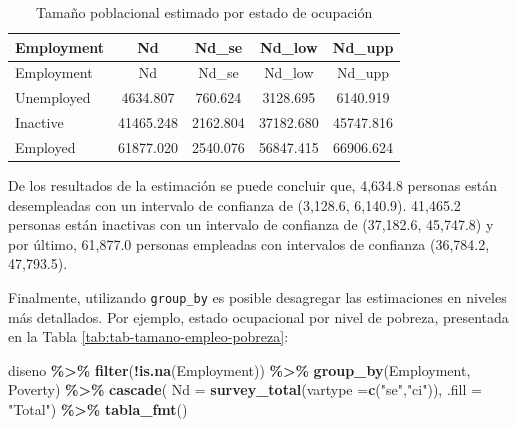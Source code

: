 \documentclass[
  spanish,
  12pt,
]{book}
\newenvironment{Shaded}{\begin{snugshade}}{\end{snugshade}}
\newcommand{\AttributeTok}[1]{\textcolor[rgb]{0.13,0.29,0.53}{#1}}
\newcommand{\FunctionTok}[1]{\textcolor[rgb]{0.13,0.29,0.53}{\textbf{#1}}}
\newcommand{\NormalTok}[1]{#1}
\newcommand{\SpecialCharTok}[1]{\textcolor[rgb]{0.81,0.36,0.00}{\textbf{#1}}}
\newcommand{\StringTok}[1]{\textcolor[rgb]{0.31,0.60,0.02}{#1}}
\begin{document}
\begin{longtable}[]{@{}lcccc@{}}
\caption{\label{tab:tab-tamano-empleo}Tamaño poblacional estimado por estado de ocupación}\tabularnewline
\toprule\noalign{}
Employment & Nd & Nd\_se & Nd\_low & Nd\_upp \\
\midrule\noalign{}
\endfirsthead
\toprule\noalign{}
Employment & Nd & Nd\_se & Nd\_low & Nd\_upp \\
\midrule\noalign{}
\endhead
\bottomrule\noalign{}
\endlastfoot
Unemployed & 4634.807 & 760.624 & 3128.695 & 6140.919 \\
Inactive & 41465.248 & 2162.804 & 37182.680 & 45747.816 \\
Employed & 61877.020 & 2540.076 & 56847.415 & 66906.624 \\
\end{longtable}

De los resultados de la estimación se puede concluir que, 4,634.8 personas están desempleadas con un intervalo de confianza de (3,128.6, 6,140.9). 41,465.2 personas están inactivas con un intervalo de confianza de (37,182.6, 45,747.8) y por último, 61,877.0 personas empleadas con intervalos de confianza (36,784.2, 47,793.5).

Finalmente, utilizando \texttt{group\_by} es posible desagregar las estimaciones en niveles más detallados. Por ejemplo, estado ocupacional por nivel de pobreza, presentada en la Tabla \ref{tab:tab-tamano-empleo-pobreza}:

\begin{Shaded}
\begin{Highlighting}[]
\NormalTok{diseno }\SpecialCharTok{\%\textgreater{}\%} 
  \FunctionTok{filter}\NormalTok{(}\SpecialCharTok{!}\FunctionTok{is.na}\NormalTok{(Employment)) }\SpecialCharTok{\%\textgreater{}\%}
  \FunctionTok{group\_by}\NormalTok{(Employment, Poverty) }\SpecialCharTok{\%\textgreater{}\%} 
  \FunctionTok{cascade}\NormalTok{( }\AttributeTok{Nd =} \FunctionTok{survey\_total}\NormalTok{(}\AttributeTok{vartype =}\FunctionTok{c}\NormalTok{(}\StringTok{"se"}\NormalTok{,}\StringTok{"ci"}\NormalTok{)), }
           \AttributeTok{.fill =} \StringTok{"Total"}\NormalTok{) }\SpecialCharTok{\%\textgreater{}\%}
  \FunctionTok{tabla\_fmt}\NormalTok{()}
\end{Highlighting}
\end{Shaded}
\end{document}
